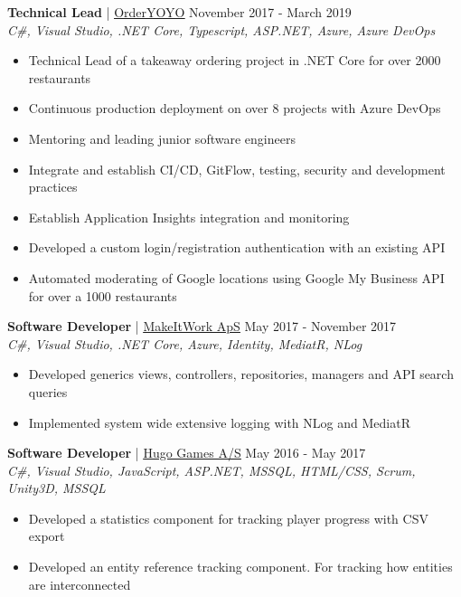 \documentclass[margin, 10pt, hidelinks]{res} %
\newcommand{\emphasize}{\bf} %
\begin{document}
\begin{resume}
{\emphasize Technical Lead} | \href{https://orderyoyo.com/}{\underline{OrderYOYO}}    \hfill November 2017 - March 2019  \\
{\it C\#, Visual Studio, .NET Core, Typescript, ASP.NET, Azure, Azure DevOps} %
\begin{itemize} \setlength{\itemindent}{-0.1in}\itemsep 0pt %
\item Technical Lead of a takeaway ordering project in .NET Core for over 2000 restaurants
\item Continuous production deployment on over 8 projects with Azure DevOps
\item Mentoring and leading junior software engineers
\item Integrate and establish  CI/CD, GitFlow, testing, security and development practices
\item Establish Application Insights integration and monitoring
\item Developed a custom login/registration authentication with an existing API
\item Automated moderating of Google locations using Google My Business API for over a 1000 restaurants
\end{itemize}

{\emphasize Software Developer} | \href{http://www.makeitwork.dk}{\underline{MakeItWork ApS}}  \hfill May 2017 - November 2017  \\
{\it C\#, Visual Studio, .NET Core, Azure, Identity, MediatR, NLog  } %
\begin{itemize} \setlength{\itemindent}{-0.1in}\itemsep 0pt %
\item Developed generics views, controllers, repositories, managers and API search queries
\item Implemented system wide extensive logging with NLog and MediatR
\end{itemize}

{\emphasize Software Developer} | \href{https://www.5thplanetgames.com/}{\underline{Hugo Games A/S}}   \hfill May 2016 - May 2017  \\
{\it C\#, Visual Studio, JavaScript, ASP.NET, MSSQL, HTML/CSS, Scrum, Unity3D, MSSQL} %
\begin{itemize} \setlength{\itemindent}{-0.1in}\itemsep 0pt %
\item Developed a statistics component for tracking player progress with CSV export
\item Developed an entity reference tracking component. For tracking how entities are interconnected
\end{itemize}


\end{resume}
\end{document}
